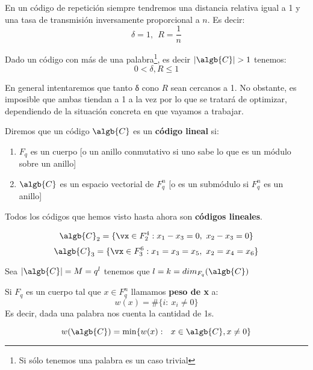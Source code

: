 \begin{example}
En un código de repetición siempre tendremos una distancia relativa igual a 1 y una tasa de transmisión inversamente proporcional a $n$. Es decir:
\[δ=1, \ \ R = \frac{1}{n}\]
\end{example}

\obs Dado un código con más de una palabra\footnote{Si sólo tenemos una palabra es un caso trivial}, es decir $|\algb{C}|>1$ tenemos:
\[0 < δ,R \leq 1\]

En general intentaremos que tanto δ cono $R$ sean cercanos a 1. No obstante, es imposible que ambas tiendan a 1 a la vez por lo que se tratará de optimizar, dependiendo de la situación concreta en que vayamos a trabajar.

\begin{defn}
Diremos que un código $\algb{C}$ es un \textbf{código lineal} si:
\begin{enumerate}
\item $F_q$ es un cuerpo [o un anillo conmutativo si uno sabe lo que es un módulo sobre un anillo]

\item $\algb{C}$ es un espacio vectorial de $F_q^n$ [o es un submódulo si $F_q^n$ es un anillo]
\end{enumerate}
\end{defn}

\begin{example}
Todos los códigos que hemos visto hasta ahora son \textbf{códigos lineales}.

\[\algb{C}_2 = \{\vx\in F_2^4: x_1-x_3 = 0 , \  x_2-x_3 = 0\}\]
\[\algb{C}_3 = \{\vx \in F_3^6: x_1=x_3=x_5, \ x_2=x_4=x_6\}\]
\end{example}

\obs Sea $|\algb{C}|=M=q^l$ tenemos que $l=k=dim_{F_q}(\algb{C})$

\begin{defn}[Peso]
Si $F_q$ es un cuerpo tal que $x\in F_q^n$ llamamos \textbf{peso de x} a:
\[w(x) = \# \{i: \ x_i \neq 0\}\]
Es decir, dada una palabra nos cuenta la cantidad de 1s.
\end{defn}

\begin{defn}
\[w(\algb{C}) = \min \{ w(x) : \ \ x \in \algb{C}, x \neq 0\}\]
\end{defn}

